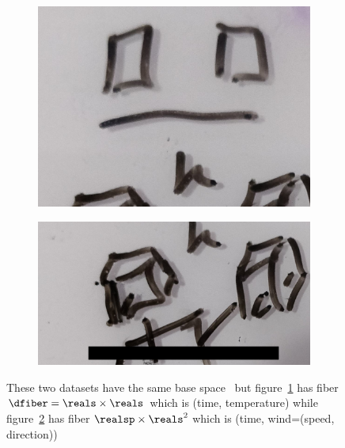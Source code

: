 \documentclass[../main.tex]{subfiles}
\begin{document}
\begin{figure}[H]
    \begin{subfigure}{.5\textwidth}
        \includegraphics[width=\textwidth]{figures/math/temp_2f.png}
        \caption{}
        \label{fig:fiber_example_plane}
    \end{subfigure}
    \begin{subfigure}{.5\textwidth}
        \includegraphics[width=\textwidth]{figures/math/temp_3f.png}
        \caption{}
        \label{fig:fiber_example_cube}
    \end{subfigure}
    \caption{These two datasets have the same base space \dbase\, but figure~\ref{fig:fiber_example_plane} has fiber  $\dfiber=\reals\times\reals$ which is (time, temperature) while figure~\ref{fig:fiber_example_cube} has fiber $\realsp\times\reals^2$ which is (time, wind=(speed, direction))}
    \label{fig:data_fiber_example}
\end{figure}
\end{document}
